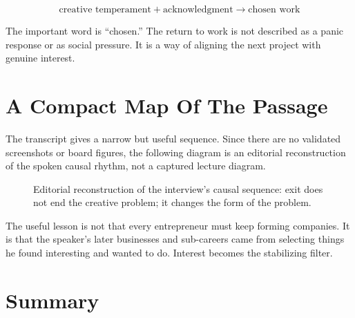 \begin{equation}
\text{creative temperament}
+
\text{acknowledgment}
\longrightarrow
\text{chosen work}
\end{equation}

The important word is ``chosen.'' The return to work is not described as a panic response or as social pressure. It is a way of aligning the next project with genuine interest.

\section{A Compact Map Of The Passage}

The transcript gives a narrow but useful sequence. Since there are no validated screenshots or board figures, the following diagram is an editorial reconstruction of the spoken causal rhythm, not a captured lecture diagram.

\begin{figure}
\centering
{}
\caption{Editorial reconstruction of the interview's causal sequence: exit does not end the creative problem; it changes the form of the problem.}
\end{figure}

The useful lesson is not that every entrepreneur must keep forming companies. It is that the speaker's later businesses and sub-careers came from selecting things he found interesting and wanted to do. Interest becomes the stabilizing filter.

\section{Summary}


